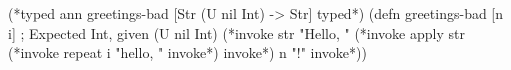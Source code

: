 \begin{cljlisting}
(*typed ann  greetings-bad [Str (U nil Int) -> Str] typed*)
(defn greetings-bad [n i]           ; Expected Int, given (U nil Int)
  (*invoke str "Hello, " (*invoke apply str (*invoke repeat i "hello, " invoke*) invoke*) n "!" invoke*))
\end{cljlisting}


%
%
%
%
%
%
%


